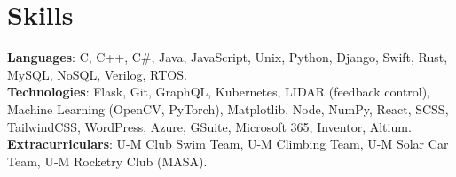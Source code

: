 \documentclass[letterpaper,11pt]{article}
\begin{document}
\section{Skills}
\begin{itemize}[leftmargin=0.15in, label={}]
	\small{\item{
		\textbf{Languages}{: C, C++, C\#, Java, JavaScript, Unix, Python, Django, Swift, Rust, MySQL, NoSQL, Verilog, RTOS.} \\
		\textbf{Technologies}{: Flask, Git, GraphQL, Kubernetes, LIDAR (feedback control), Machine Learning (OpenCV, PyTorch), Matplotlib, Node, NumPy, React, SCSS, TailwindCSS, WordPress, Azure, GSuite, Microsoft 365, Inventor, Altium.} \\
        \textbf{Extracurriculars}{: U-M Club Swim Team, U-M Climbing Team, U-M Solar Car Team, U-M Rocketry Club (MASA).} \\
	}}
\end{itemize}


\end{document}
